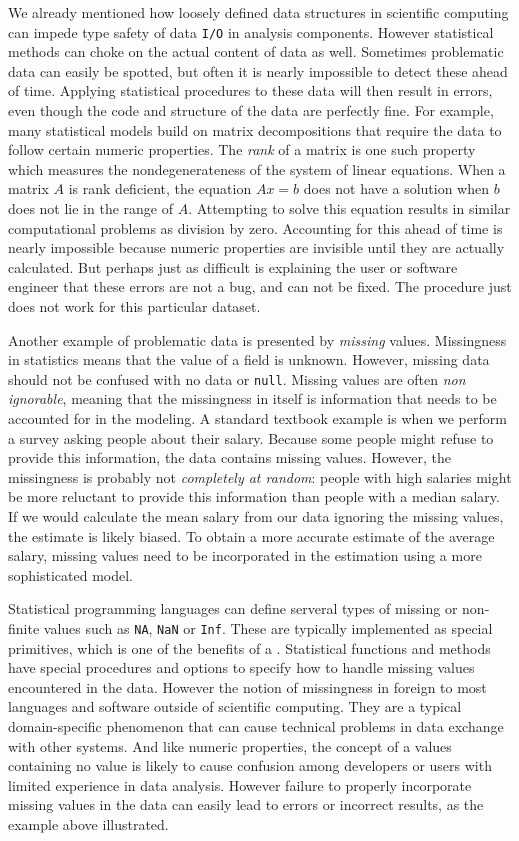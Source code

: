 We already mentioned how loosely defined data structures in scientific computing can impede type safety of data \texttt{I/O} in analysis components. However statistical methods can choke on the actual content of data as well. Sometimes problematic data can easily be spotted, but often it is nearly impossible to detect these ahead of time. Applying statistical procedures to these data will then result in errors, even though the code and structure of the data are perfectly fine. For example, many statistical models build on matrix decompositions that require the data to follow certain numeric properties. The \emph{rank} of a matrix is one such property which measures the nondegenerateness of the system of linear equations. When a matrix $A$ is rank deficient, the equation $Ax=b$ does not have a solution when $b$ does not lie in the range of $A$. Attempting to solve this equation results in similar computational problems as division by zero. Accounting for this ahead of time is nearly impossible because numeric properties are invisible until they are actually calculated. But perhaps just as difficult is explaining the user or software engineer that these errors are not a bug, and can not be fixed. The procedure just does not work for this particular dataset.

Another example of problematic data is presented by \emph{missing} values. Missingness in statistics means that the value of a field is unknown. However, missing data should not be confused with no data or \texttt{null}. Missing values are often \emph{non ignorable}, meaning that the missingness in itself is information that needs to be accounted for in the modeling. A standard textbook example is when we perform a survey asking people about their salary. Because some people might refuse to provide this information, the data contains missing values. However, the missingness is probably not \emph{completely at random}: people with high salaries might be more reluctant to provide this information than people with a median salary. If we would calculate the mean salary from our data ignoring the missing values, the estimate is likely biased. To obtain a more accurate estimate of the average salary, missing values need to be incorporated in the estimation using a more sophisticated model. 

Statistical programming languages can define serveral types of missing or non-finite values such as \texttt{NA}, \texttt{NaN} or \texttt{Inf}. These are typically implemented as special primitives, which is one of the benefits of a \DSL. Statistical functions and methods have special procedures and options to specify how to handle missing values encountered in the data. However the notion of missingness in foreign to most languages and software outside of scientific computing. They are a typical domain-specific phenomenon that can cause technical problems in data exchange with other systems. And like numeric properties, the concept of a values containing no value is likely to cause confusion among developers or users with limited experience in data analysis. However failure to properly incorporate missing values in the data can easily lead to errors or incorrect results, as the example above illustrated.

